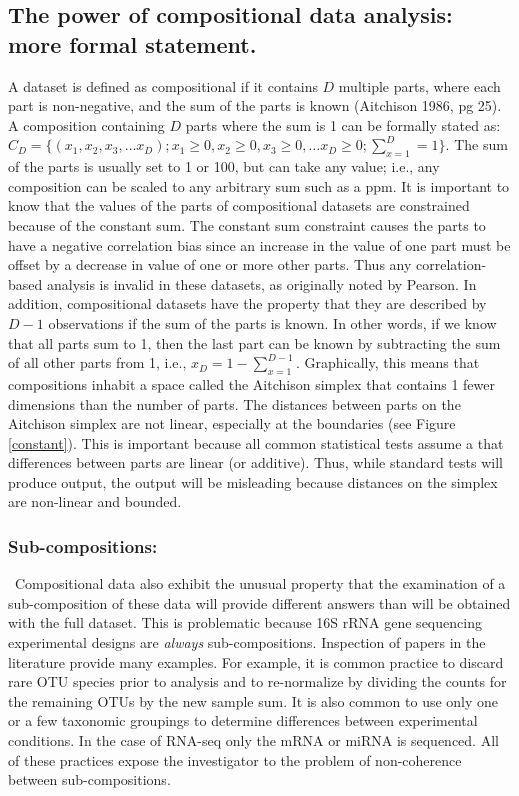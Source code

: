\documentclass[11pt]{article}\usepackage[]{graphicx}\usepackage[]{color}
\begin{document}
\subsection{The power of compositional data analysis: more formal statement.}
A dataset is defined as compositional if it contains $D$ multiple parts, where each part is non-negative, and the sum of the parts is known (Aitchison 1986, pg 25). A composition containing $D$ parts where the sum is 1 can be formally stated as: $C_D = \{(x_1,x_2,x_3, \ldots x_D); x_1\ge 0, x_2\ge 0, x_3 \ge 0, \ldots x_D \ge 0; \sum_{x=1}^{D} = 1\}$. The sum of the parts is usually set to 1 or 100, but can take any value; i.e., any composition can be scaled to any arbitrary sum such as a ppm.  It is important to know that the values of the parts of compositional datasets are constrained because of the constant sum. The constant sum constraint causes the parts to have a negative correlation bias since an increase in the value of one part must be offset by a decrease in value of one or more other parts. Thus any correlation-based analysis is invalid in these datasets, as originally noted by Pearson\cite{Pearson:1896}. In addition, compositional datasets have the property that they are described by $D-1$ observations if the sum of the parts is known\cite{Aitchison:1986}. In other words, if we know that all parts sum to 1, then the last part can be known by subtracting the sum of all other parts from 1, i.e., $x_D = 1-\sum_{x=1}^{D-1}$. Graphically, this means that compositions inhabit a space called the Aitchison simplex that contains 1 fewer dimensions than the number of parts. The distances between parts on the Aitchison simplex are not linear, especially at the boundaries (see Figure \ref{constant}). This is important because all common statistical tests assume a that differences between parts are linear (or additive). Thus, while standard tests will produce output, the output will be misleading because distances on the simplex are non-linear and bounded. 

\subsubsection{Sub-compositions:}~Compositional data also exhibit the unusual property that the examination of a sub-composition of these data will provide different answers than will be obtained with the full dataset\cite{Aitchison:1986}. This is problematic because 16S rRNA gene sequencing experimental designs are \emph{always} sub-compositions. Inspection of papers in the literature provide many examples. For example, it is common practice to discard rare OTU species prior to analysis and to re-normalize by dividing the counts for the remaining OTUs by the new sample sum. It is also common to use only one or a few taxonomic groupings to determine differences between experimental conditions. In the case of RNA-seq only the mRNA or miRNA is sequenced. All of these practices expose the investigator to the problem of non-coherence between sub-compositions.
\end{document}
